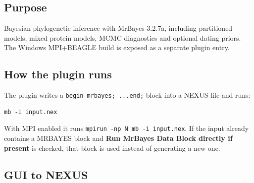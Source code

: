 \documentclass[11pt]{report}
\begin{document}
\subsection{Purpose}

Bayesian phylogenetic inference with MrBayes 3.2.7a, including partitioned models, mixed protein models, MCMC diagnostics and optional dating priors. The Windows MPI+BEAGLE build is exposed as a separate plugin entry.

\subsection{How the plugin runs}

The plugin writes a \texttt{begin mrbayes; .\allowbreak .\allowbreak .\allowbreak  end;} block into a NEXUS file and runs:

\begin{lstlisting}
mb -i input.nex
\end{lstlisting}

With MPI enabled it runs \texttt{mpirun -np N mb -i input.\allowbreak nex}. If the input already contains a MRBAYES block and \textbf{Run MrBayes Data Block directly if present} is checked, that block is used instead of generating a new one.

\subsection{GUI to NEXUS}
\end{document}
